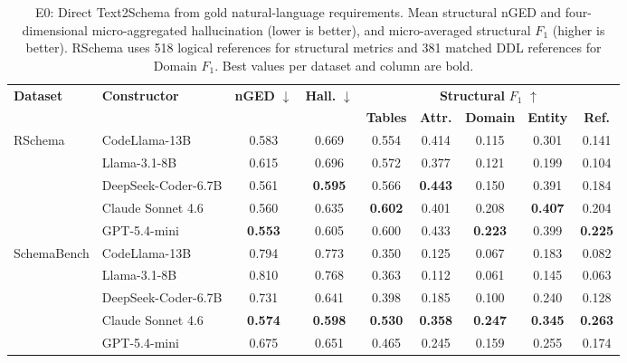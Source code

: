 \begin{table}[t]
\centering
\small
\setlength{\tabcolsep}{3pt}
\renewcommand{\arraystretch}{1.0}
\caption{E0: Direct Text2Schema from gold natural-language
requirements. Mean structural nGED and four-dimensional
micro-aggregated hallucination (lower is better), and
micro-averaged structural $F_1$ (higher is better).
RSchema uses 518 logical references for structural metrics
and 381 matched DDL references for Domain $F_1$.
Best values per dataset and column are bold.}
\label{tab:e0_overall}
\begin{tabular*}{\textwidth}
{@{\extracolsep{\fill}}llccccccc@{}}
\toprule
\multirow{2}{*}{\textbf{Dataset}}
& \multirow{2}{*}{\textbf{Constructor}}
& \multirow{2}{*}{\textbf{nGED} $\downarrow$}
& \multirow{2}{*}{\textbf{Hall.} $\downarrow$}
& \multicolumn{5}{c}{\textbf{Structural} $F_1$ $\uparrow$} \\
\cmidrule(lr){5-9}
& & & &
\textbf{Tables} & \textbf{Attr.}
& \textbf{Domain} & \textbf{Entity}
& \textbf{Ref.} \\
\midrule
RSchema & CodeLlama-13B & 0.583 & 0.669 & 0.554 & 0.414 & 0.115 & 0.301 & 0.141 \\
 & Llama-3.1-8B & 0.615 & 0.696 & 0.572 & 0.377 & 0.121 & 0.199 & 0.104 \\
 & DeepSeek-Coder-6.7B & 0.561 & \textbf{0.595} & 0.566 & \textbf{0.443} & 0.150 & 0.391 & 0.184 \\
 & Claude Sonnet 4.6 & 0.560 & 0.635 & \textbf{0.602} & 0.401 & 0.208 & \textbf{0.407} & 0.204 \\
 & GPT-5.4-mini & \textbf{0.553} & 0.605 & 0.600 & 0.433 & \textbf{0.223} & 0.399 & \textbf{0.225} \\
\midrule
SchemaBench & CodeLlama-13B & 0.794 & 0.773 & 0.350 & 0.125 & 0.067 & 0.183 & 0.082 \\
 & Llama-3.1-8B & 0.810 & 0.768 & 0.363 & 0.112 & 0.061 & 0.145 & 0.063 \\
 & DeepSeek-Coder-6.7B & 0.731 & 0.641 & 0.398 & 0.185 & 0.100 & 0.240 & 0.128 \\
 & Claude Sonnet 4.6 & \textbf{0.574} & \textbf{0.598} & \textbf{0.530} & \textbf{0.358} & \textbf{0.247} & \textbf{0.345} & \textbf{0.263} \\
 & GPT-5.4-mini & 0.675 & 0.651 & 0.465 & 0.245 & 0.159 & 0.255 & 0.174 \\
\bottomrule
\end{tabular*}
\end{table}

